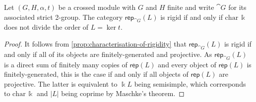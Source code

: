 \begin{proposition}\label{prop:2-grp-GV-and-rigid}
  Let \((G,H,\alpha,t)\) be a crossed module with \(G\) and \(H\) finite and write \( \cat{G}\) for its associated strict 2-group.
  The category \(\mathsf{rep}_{\cat{G}}(L)\) is rigid if and only if \(\mathrm{char}\, \Bbbk\) does not divide the order of \(L= \ker t\).
\end{proposition}
\begin{proof}
  It follows from \cref{prop:characterisation-of-rigidity} that \(\mathsf{rep}_{\cat{G}}(L)\) is rigid
  if and only if all of its objects are finitely\hyp{}generated and projective.
  As \(\mathsf{rep}_{\cat{G}}(L)\) is a direct sum of finitely many copies of \(\mathsf{rep}(L)\)
  and every object of \(\mathsf{rep}(L)\) is finitely\hyp{}generated,
  this is the case if and only if all objects of \(\mathsf{rep}(L)\) are projective.
  The latter is equivalent to \(\Bbbk L\) being semisimple, which
  corresponds to \(\mathrm{char}\, \Bbbk\) and \(|L|\) being coprime
  by Maschke's theorem.
\end{proof}

